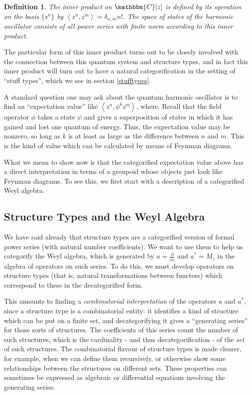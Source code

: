 \documentclass{amsart} \usepackage{amsmath,amssymb,bbm}
\newtheorem{definition}{Definition}
\newcommand{\inprod}[1]{\left\langle{#1}\right\rangle}
\begin{document}
\begin{definition}
  The inner product on $\mathbbm{C}[z]$ is defined by its operation on
  the basis $\{z^n\}$ by $\inprod{z^n, z^m} = \delta_{n, m} n!$.  The
  space of states of the harmonic oscillator consists of all power
  series with finite norm according to this inner product.
\end{definition}

The particular form of this inner product turns out to be closely
involved with the connection between this quantum system and structure
types, and in fact this inner product will turn out to have a natural
categorification in the setting of ``stuff types'', which we see in
section \ref{stufftypes}.

A standard question one may ask about the quantum harmonic oscillator
is to find an ``expectation value'' like $\inprod{z^n,\phi^k z^m}$,
where.  Recall that the field operator $\phi$ takes a state $\psi$ and
gives a superposition of states in which it has gained and lost one
quantum of energy.  Thus, the expectation value may be nonzero, so
long as $k$ is at least as large as the difference between $n$ and
$m$.  This is the kind of value which can be calculated by means of
Feynman diagrams.

What we mean to show now is that the categorified expectation value
above has a direct interpretation in terms of a groupoid whose objects
just look like Feynman diagrams.  To see this, we first start with a
description of a categorified Weyl algebra.

\subsection{Structure Types and the Weyl Algebra\label{sec:strtypeweyl}}

We have said already that structure types are a categorified version
of formal power series (with natural number coefficients).  We want to
use them to help us categorify the Weyl algebra, which is generated by
$a=\frac{\partial}{\partial z}$ and $a^{\ast} = M_z$ in the algebra of
operators on such series.  To do this, we must develop operators on
structure types (that is, natural transformations between functors)
which correspond to these in the decategorified form.

This amounts to finding a \textit{combinatorial interpretation} of the
operators $a$ and $a^{\ast}$, since a structure type is a
combinatorial entity: it identifies a kind of structure which can be
put on a finite set, and decategorifying it gives a ``generating
series'' for those sorts of structures.  The coefficients of this
series count the number of such structures, which is the cardinality -
and thus decategorification - of the \textit{set} of such structures.
The combinatorial flavour of structure types is made clearer, for
example, when we can define them recursively, or otherwise show some
relationships between the structures on different sets. These
properties can sometimes be expressed as algebraic or differential
equations involving the generating series.
\end{document}
